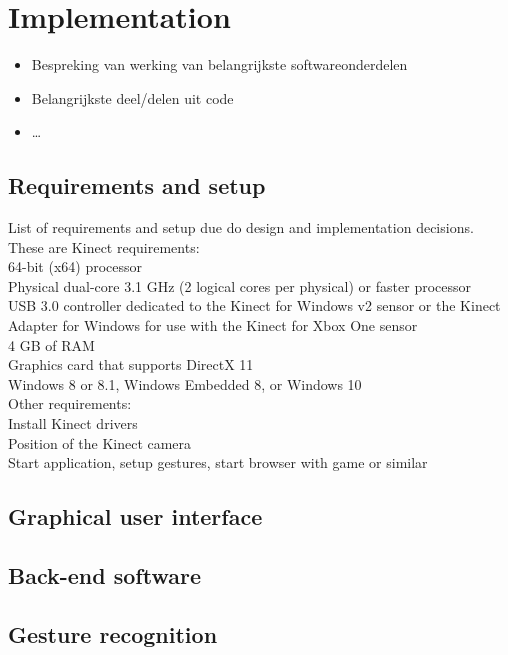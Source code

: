 \chapter{Implementation}

\begin{itemize}
\item Bespreking van werking van belangrijkste softwareonderdelen
\item Belangrijkste deel/delen uit code
\item \ldots
\end{itemize}


\section{Requirements and setup}

List of requirements and setup due do design and implementation decisions.\\

These are Kinect requirements:\\

64-bit (x64) processor\\
Physical dual-core 3.1 GHz (2 logical cores per physical) or faster processor\\
USB 3.0 controller dedicated to the Kinect for Windows v2 sensor or the Kinect Adapter for Windows for use with the Kinect for Xbox One sensor\\
4 GB of RAM\\
Graphics card that supports DirectX 11\\
Windows 8 or 8.1, Windows Embedded 8, or Windows 10\\


Other requirements:\\

Install Kinect drivers\\
Position of the Kinect camera\\
Start application, setup gestures, start browser with game or similar


\section{Graphical user interface}

\section{Back-end software}

\section{Gesture recognition}

